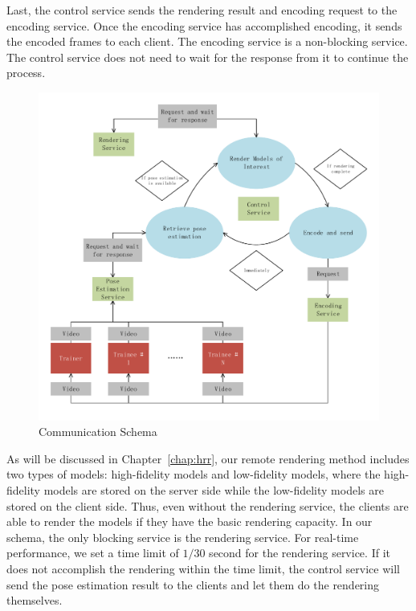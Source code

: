 Last, the control service sends the rendering result and encoding request to the encoding service. Once the encoding service has accomplished encoding, it sends the encoded frames to each client.
The encoding service is a non-blocking service. The control service does not need to wait for the response from it to continue the process.

\begin{figure}[!htbp]
	\centering
	\includegraphics[width=\textwidth]{figures/communication_schema.pdf}
	\caption{Communication Schema}
	\label{fig-comm-schem}
\end{figure}

As will be discussed in Chapter~\ref{chap:hrr}, our remote rendering method includes two types of models: high-fidelity models and low-fidelity models, where the high-fidelity models are stored on the server side while the low-fidelity models are stored on the client side. Thus, even without the rendering service, the clients are able to render the models if they have the basic rendering capacity.
In our schema, the only blocking service is the rendering service. For real-time performance, we set a time limit of $1/30$ second for the rendering service. If it does not accomplish the rendering within the time limit, the control service will send the pose estimation result to the clients and let them do the rendering themselves.

